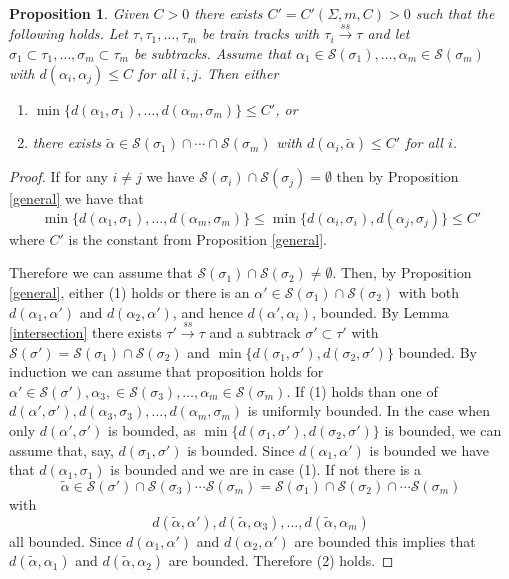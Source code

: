 \documentclass[11pt]{article}
\newtheorem{prop}[thm]{Proposition}
\theoremstyle{remark}
\def\S{{\mathcal S}}
\def\ss{{\overset{ss}\longrightarrow}}
\begin{document}
\begin{prop}\label{curve version}
Given $C>0$ there exists $C' = C'(\Sigma, m,C)>0$ such that the following holds. Let $\tau, \tau_1, \dots, \tau_m$ be train tracks with $\tau_i \ss \tau$ and let $\sigma_1 \subset \tau_1, \dots, \sigma_m \subset \tau_m$ be subtracks. Assume that $\alpha_1 \in \S(\sigma_1), \dots, \alpha_m \in \S(\sigma_m)$ with $d(\alpha_i, \alpha_j) \le C$ for all $i, j$. Then either
\begin{enumerate}[(1)]
\item $\min\{d(\alpha_1, \sigma_1), \dots, d(\alpha_m, \sigma_m)\} \le C'$, or
\item there exists $\tilde\alpha \in \S(\sigma_1) \cap \cdots \cap \S(\sigma_m)$ with $d(\alpha_i, \tilde\alpha) \le C'$ for all $i$.
\end{enumerate} 
\end{prop}

\begin{proof}
If for any $i \neq j$ we have $\S(\sigma_i) \cap \S(\sigma_j) = \emptyset$ then by Proposition \ref{general} we have that
$$\min\{d(\alpha_1, \sigma_1), \dots, d(\alpha_m, \sigma_m)\} \le \min\{d(\alpha_i, \sigma_i), d(\alpha_j, \sigma_j)\} \le C'$$
where $C'$ is the constant from Proposition \ref{general}.

Therefore we can assume that $\S(\sigma_1) \cap \S(\sigma_2) \neq \emptyset$. Then, by Proposition \ref{general}, either (1) holds or there is an $\alpha' \in \S(\sigma_1) \cap \S(\sigma_2)$ with both $d(\alpha_1, \alpha')$ and $d(\alpha_2, \alpha')$, and hence $d(\alpha', \alpha_i)$, bounded. 
By Lemma \ref{intersection} there exists $\tau' \ss \tau$ and a subtrack $\sigma' \subset \tau'$ with $\S(\sigma') = \S(\sigma_1) \cap \S(\sigma_2)$
and $\min\{d(\sigma_1,\sigma'),d(\sigma_2,\sigma')\}$ bounded. By induction we can assume that proposition holds for $\alpha' \in \S(\sigma'), \alpha_3, \in \S(\sigma_3), \dots, \alpha_m \in \S(\sigma_m)$. If (1) holds than one of $d(\alpha', \sigma'), d(\alpha_3, \sigma_3), \dots, d(\alpha_m, \sigma_m)$ is uniformly bounded. In the case when only $d(\alpha', \sigma')$ is bounded, as $\min\{d(\sigma_1, \sigma'), d(\sigma_2, \sigma')\}$ is bounded, we can assume that, say, $d(\sigma_1, \sigma')$ is bounded. Since $d(\alpha_1, \alpha')$ is bounded we have that $d(\alpha_1, \sigma_1)$ is bounded and we are in case (1).  If not there is a
$$\tilde\alpha \in \S(\sigma') \cap \S(\sigma_3) \cdots \S(\sigma_m) = \S(\sigma_1) \cap \S(\sigma_2) \cap \cdots \S(\sigma_m)$$
with 
$$d(\tilde\alpha, \alpha'), d(\tilde\alpha,\alpha_3), \dots, d(\tilde\alpha,\alpha_m)$$
all bounded. Since $d(\alpha_1,\alpha')$ and $d(\alpha_2, \alpha')$ are bounded this implies that $d(\tilde\alpha, \alpha_1)$ and $d(\tilde\alpha, \alpha_2)$ are bounded. Therefore (2) holds.
\end{proof}
\end{document}
